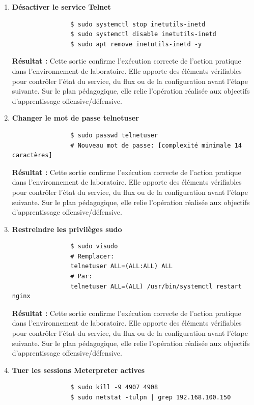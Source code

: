 \documentclass[12pt,a4paper,openany]{report}
\begin{document}
	\begin{tcolorbox}[colback=accent!5!white, breakable, nobeforeafter, colframe=accent, title=\textbf{PRIORITÉ CRITIQUE}]
		\begin{enumerate}
			\item \textbf{Désactiver le service Telnet}
			\begin{lstlisting}
				$ sudo systemctl stop inetutils-inetd
				$ sudo systemctl disable inetutils-inetd
				$ sudo apt remove inetutils-inetd -y
			\end{lstlisting}
			
			\textbf{Résultat :} Cette sortie confirme l'exécution correcte de l'action pratique dans l'environnement de laboratoire. Elle apporte des éléments vérifiables pour contrôler l'état du service, du flux ou de la configuration avant l'étape suivante. Sur le plan pédagogique, elle relie l'opération réalisée aux objectifs d'apprentissage offensive/défensive.
			
			
			\item \textbf{Changer le mot de passe telnetuser}
			\begin{lstlisting}
				$ sudo passwd telnetuser
				# Nouveau mot de passe: [complexité minimale 14 caractères]
			\end{lstlisting}
			
			\textbf{Résultat :} Cette sortie confirme l'exécution correcte de l'action pratique dans l'environnement de laboratoire. Elle apporte des éléments vérifiables pour contrôler l'état du service, du flux ou de la configuration avant l'étape suivante. Sur le plan pédagogique, elle relie l'opération réalisée aux objectifs d'apprentissage offensive/défensive.
			
			
			\item \textbf{Restreindre les privilèges sudo}
			\begin{lstlisting}
				$ sudo visudo
				# Remplacer:
				telnetuser ALL=(ALL:ALL) ALL
				# Par:
				telnetuser ALL=(ALL) /usr/bin/systemctl restart nginx
			\end{lstlisting}
			
			\textbf{Résultat :} Cette sortie confirme l'exécution correcte de l'action pratique dans l'environnement de laboratoire. Elle apporte des éléments vérifiables pour contrôler l'état du service, du flux ou de la configuration avant l'étape suivante. Sur le plan pédagogique, elle relie l'opération réalisée aux objectifs d'apprentissage offensive/défensive.
			
			
			\item \textbf{Tuer les sessions Meterpreter actives}
			\begin{lstlisting}
				$ sudo kill -9 4907 4908
				$ sudo netstat -tulpn | grep 192.168.100.150
			\end{lstlisting}
			

\end{enumerate}
\end{tcolorbox}
\end{document}
